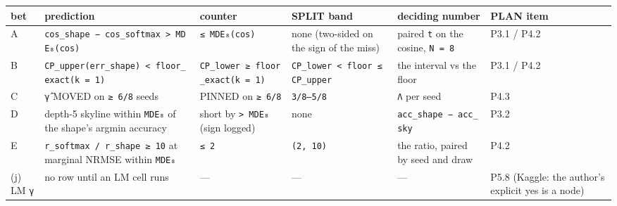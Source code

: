 \documentclass[11pt,a4paper]{article}
\newcounter{none}                 %
\theoremstyle{plain}
\theoremstyle{definition}
\theoremstyle{remark}
\begin{document}
{\def\LTcaptype{none} %
\begin{longtable}[]{@{}
  >{\raggedright\arraybackslash}p{}
  >{\raggedright\arraybackslash}p{}
  >{\raggedright\arraybackslash}p{}
  >{\raggedright\arraybackslash}p{}
  >{\raggedright\arraybackslash}p{}
  >{\raggedright\arraybackslash}p{}@{}}
\toprule\noalign{}
\begin{minipage}[b]{\linewidth}\raggedright
bet
\end{minipage} & \begin{minipage}[b]{\linewidth}\raggedright
prediction
\end{minipage} & \begin{minipage}[b]{\linewidth}\raggedright
counter
\end{minipage} & \begin{minipage}[b]{\linewidth}\raggedright
SPLIT band
\end{minipage} & \begin{minipage}[b]{\linewidth}\raggedright
deciding number
\end{minipage} & \begin{minipage}[b]{\linewidth}\raggedright
PLAN item
\end{minipage} \\
\midrule\noalign{}
\endhead
\bottomrule\noalign{}
\endlastfoot
A & \texttt{cos\_shape\ −\ cos\_softmax\ \textgreater{}\ MDE₈(cos)} &
\texttt{≤\ MDE₈(cos)} & none (two-sided on the sign of the miss) &
paired \texttt{t} on the cosine, \texttt{N\ =\ 8} & P3.1 / P4.2 \\
B & \texttt{CP\_upper(err\_shape)\ \textless{}\ floor\_exact(k\ =\ 1)} &
\texttt{CP\_lower\ ≥\ floor\_exact(k\ =\ 1)} &
\texttt{CP\_lower\ \textless{}\ floor\ ≤\ CP\_upper} & the interval vs
the floor & P3.1 / P4.2 \\
C & \texttt{γ̂} MOVED on \texttt{≥\ 6/8} seeds & PINNED on
\texttt{≥\ 6/8} & \texttt{3/8–5/8} & \texttt{Λ} per seed & P4.3 \\
D & depth-5 skyline within \texttt{MDE₈} of the shape's argmin accuracy
& short by \texttt{\textgreater{}\ MDE₈} (sign logged) & none &
\texttt{acc\_shape\ −\ acc\_sky} & P3.2 \\
E & \texttt{r\_softmax\ /\ r\_shape\ ≥\ 10} at marginal NRMSE within
\texttt{MDE₈} & \texttt{≤\ 2} & \texttt{(2,\ 10)} & the ratio, paired by
seed and draw & P4.2 \\
(j) LM \texttt{γ} & no row until an LM cell runs & --- & --- & --- &
P5.8 (Kaggle: the author's explicit yes is a node) \\
\end{longtable}
}
\end{document}
